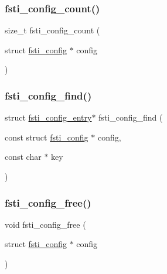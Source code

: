 \mbox{\label{fsti-config_8h_a508022bb109124636ed4c7e0002c2c08}} 
\subsubsection{\texorpdfstring{fsti\+\_\+config\+\_\+count()}{fsti\_config\_count()}}
{\footnotesize\ttfamily size\+\_\+t fsti\+\_\+config\+\_\+count (\begin{DoxyParamCaption}\item[{struct \mbox{\hyperlink{structfsti__config}{fsti\+\_\+config}} $\ast$}]{config }\end{DoxyParamCaption})}

\mbox{\label{fsti-config_8h_a83fb2b9e2caaf46ab1c6ff13c618718f}} 
\subsubsection{\texorpdfstring{fsti\+\_\+config\+\_\+find()}{fsti\_config\_find()}}
{\footnotesize\ttfamily struct \mbox{\hyperlink{structfsti__config__entry}{fsti\+\_\+config\+\_\+entry}}$\ast$ fsti\+\_\+config\+\_\+find (\begin{DoxyParamCaption}\item[{const struct \mbox{\hyperlink{structfsti__config}{fsti\+\_\+config}} $\ast$}]{config,  }\item[{const char $\ast$}]{key }\end{DoxyParamCaption})}

\mbox{\label{fsti-config_8h_a89af0836846de6cf965e78643823705c}} 
\subsubsection{\texorpdfstring{fsti\+\_\+config\+\_\+free()}{fsti\_config\_free()}}
{\footnotesize\ttfamily void fsti\+\_\+config\+\_\+free (\begin{DoxyParamCaption}\item[{struct \mbox{\hyperlink{structfsti__config}{fsti\+\_\+config}} $\ast$}]{config }\end{DoxyParamCaption})}

